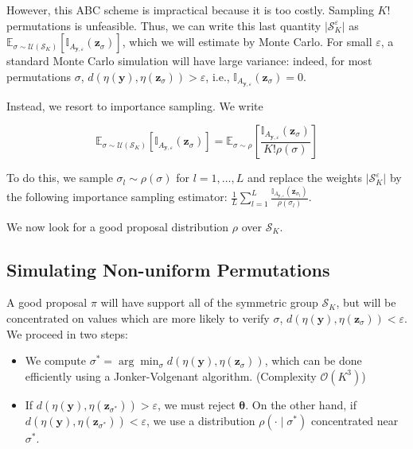 \documentclass[lineno]{biometrika}
\def\iperm{l}
\def\obsdata{\mathbf{y}}
\def\param{\boldsymbol{\theta}}
\def\simdata{\mathbf{z}}
\begin{document}
However, this ABC scheme is impractical because it is too costly. Sampling $K!$ permutations is unfeasible. Thus, we can write this last quantity $\lvert \mathcal S_K^\varepsilon \rvert$ as $\mathbb{E}_{\sigma \sim \mathcal{U}(\mathcal{S}_K)}\left[\mathbb{I}_{A_{\obsdata,\varepsilon}}(\simdata_{\sigma})\right]$, which we will estimate by Monte Carlo. For small $\varepsilon$, a standard Monte Carlo simulation will have large variance: indeed, for most permutations $\sigma$, $d(\eta(\obsdata), \eta(\simdata_{\sigma})) > \varepsilon$, i.e., $\mathbb{I}_{A_{\obsdata,\varepsilon}}(\simdata_{\sigma})=0$. 

Instead, we resort to importance sampling. We write

\[\mathbb{E}_{\sigma \sim \mathcal{U}(\mathcal{S}_K)}\left[\mathbb{I}_{A_{\obsdata,\varepsilon}}(\simdata_{\sigma})\right] = 
\mathbb{E}_{\sigma \sim \rho}\left[\frac{\mathbb{I}_{A_{\obsdata,\varepsilon}}(\simdata_{\sigma})}{K!\rho(\sigma)}\right]\]

To do this, we sample $\sigma_{\iperm} \sim \rho(\sigma)$ for $\iperm=1,\dots, L$ and replace the weights $\lvert \mathcal S_K^\varepsilon \rvert$ by the following importance sampling estimator: $\frac{1}{L}\sum_{l=1}^L \frac{\mathbb{I}_{A_{\obsdata,\varepsilon}}(\simdata_{\sigma_{\iperm}})}{\rho(\sigma_{\iperm})}$. 



We now look for a good proposal distribution $\rho$ over $\mathcal{S}_K$.

\subsection{Simulating Non-uniform Permutations}
\label{secperm}

A good proposal $\pi$ will have support all of the symmetric group $\mathcal{S}_K$, but will be concentrated on values which are more likely to verify $\sigma$, $d(\eta(\obsdata), \eta(\simdata_{\sigma})) < \varepsilon$. We proceed in two steps:

\begin{itemize}
    \item We compute $\sigma^* = \arg\min_{\sigma} d(\eta(\obsdata), \eta(\simdata_{\sigma}))$, which can be done efficiently using a Jonker-Volgenant algorithm. (Complexity $\mathcal{O}(K^3)$)
    \item If $d(\eta(\obsdata), \eta(\simdata_{\sigma^*})) > \varepsilon$, we must reject $\param$. On the other hand, if $d(\eta(\obsdata), \eta(\simdata_{\sigma^*})) < \varepsilon$, we use a distribution $\rho(\cdot\mid\sigma^*)$ concentrated near $\sigma^*$.
\end{itemize}
\end{document}

